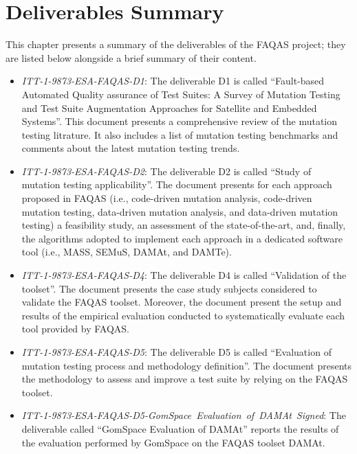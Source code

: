 
\chapter{Deliverables Summary}

This chapter presents a summary of the deliverables of the FAQAS project; they are listed below alongside a brief summary of their content.

\begin{itemize}
	\item \emph{ITT-1-9873-ESA-FAQAS-D1}: The deliverable D1 is called ``Fault-based Automated Quality assurance of Test Suites: A Survey of Mutation Testing and Test Suite Augmentation Approaches for Satellite and Embedded Systems''. This document presents a comprehensive review of the mutation testing litrature. It also includes a list of mutation testing benchmarks and comments about the latest mutation testing trends.

	\item \emph{ITT-1-9873-ESA-FAQAS-D2}: The deliverable D2 is called ``Study of mutation testing applicability''. The document presents for each approach proposed in FAQAS (i.e., code-driven mutation analysis, code-driven mutation testing, data-driven mutation analysis, and data-driven mutation testing) a feasibility study, an assessment of the state-of-the-art, and, finally, the algorithms adopted to implement each approach in a dedicated software tool (i.e., MASS, SEMuS, DAMAt, and DAMTe). 

	\item \emph{ITT-1-9873-ESA-FAQAS-D4}: The deliverable D4 is called ``Validation of the toolset''. The document presents the case study subjects considered to validate the FAQAS toolset. Moreover, the document present the setup and results of the empirical evaluation conducted to systematically evaluate each tool provided by FAQAS. 

	\item \emph{ITT-1-9873-ESA-FAQAS-D5}: The deliverable D5 is called ``Evaluation of mutation testing process and methodology definition''. The document presents the methodology to assess and improve a test suite by relying on the FAQAS toolset. 

	\item \emph{ITT-1-9873-ESA-FAQAS-D5-GomSpace\ Evaluation\ of\ DAMAt\ Signed}: The deliverable called ``GomSpace Evaluation of DAMAt'' reports the results of the evaluation performed by GomSpace on the FAQAS toolset DAMAt.


\end{itemize}
